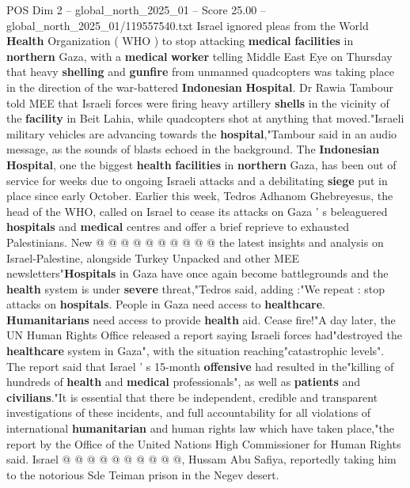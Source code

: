 \begin{textsample}{POS Dim 2 – global\_north\_2025\_01 – Score 25.00 – global\_north\_2025\_01/119557540.txt}  \label{ex:f2_pos_370}
Israel ignored pleas from the World \textbf{Health} Organization ( WHO ) to stop attacking \textbf{medical} \textbf{facilities} in \textbf{northern} Gaza, with a \textbf{medical} \textbf{worker} telling Middle East Eye on Thursday that heavy \textbf{shelling} and \textbf{gunfire} from unmanned quadcopters was taking place in the direction of the war-battered \textbf{Indonesian} \textbf{Hospital}.
Dr Rawia Tambour told MEE that Israeli forces were firing heavy artillery \textbf{shells} in the vicinity of the \textbf{facility} in Beit Lahia, while quadcopters shot at anything that moved."Israeli military vehicles are advancing towards the \textbf{hospital},"Tambour said in an audio message, as the sounds of blasts echoed in the background.
The \textbf{Indonesian} \textbf{Hospital}, one the biggest \textbf{health} \textbf{facilities} in \textbf{northern} Gaza, has been out of service for weeks due to ongoing Israeli attacks and a debilitating \textbf{siege} put in place since early October.
Earlier this week, Tedros Adhanom Ghebreyesus, the head of the WHO, called on Israel to cease its attacks on Gaza ' s beleaguered \textbf{hospitals} and \textbf{medical} centres and offer a brief reprieve to exhausted Palestinians.
New @ @ @ @ @ @ @ @ @ @ the latest insights and analysis on Israel-Palestine, alongside Turkey Unpacked and other MEE newsletters"\textbf{Hospitals} in Gaza have once again become battlegrounds and the \textbf{health} system is under \textbf{severe} threat,"Tedros said, adding :"We repeat : stop attacks on \textbf{hospitals}.
People in Gaza need access to \textbf{healthcare}. \textbf{Humanitarians} need access to provide \textbf{health} aid.
Cease fire!"A day later, the UN Human Rights Office released a report saying Israeli forces had"destroyed the \textbf{healthcare} system in Gaza", with the situation reaching"catastrophic levels".
The report said that Israel ' s 15-month \textbf{offensive} had resulted in the"killing of hundreds of \textbf{health} and \textbf{medical} professionals", as well as \textbf{patients} and \textbf{civilians}."It is essential that there be independent, credible and transparent investigations of these incidents, and full accountability for all violations of international \textbf{humanitarian} and human rights law which have taken place,"the report by the Office of the United Nations High Commissioner for Human Rights said.
Israel @ @ @ @ @ @ @ @ @ @, Hussam Abu Safiya, reportedly taking him to the notorious Sde Teiman prison in the Negev desert.

\end{textsample}
